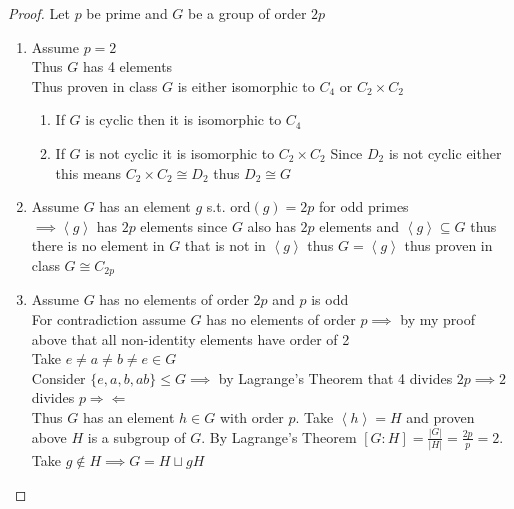 \documentclass[12pt, letterpaper]{article}
\theoremstyle{definition}
\newcommand{\contr}{\Rightarrow \Leftarrow}
\newcommand{\ang}[1]{\left\langle #1 \right\rangle}
\begin{document}
\begin{proof}
    Let $p$ be prime and $G$ be a group of order $2p$
    \begin{enumerate}
        \item Assume $p=2$\\
        Thus $G$ has 4 elements\\
        Thus proven in class $G$ is either isomorphic to $C_4$ or $C_2 \times C_2$
        \begin{enumerate}
            \item If $G$ is cyclic then it is isomorphic to $C_4$
            \item If $G$ is not cyclic it is isomorphic to $C_2 \times C_2$
            Since $D_2$ is not cyclic either this means $C_2 \times C_2 \cong D_2$ thus $D_2 \cong G$
        \end{enumerate}
        \item Assume $G$ has an element $g$ s.t. ord$(g)=2p$ for odd primes\\
        $\implies \ang{g}$ has $2p$ elements since $G$ also has $2p$ elements
        and $\ang{g} \subseteq G$ thus there is no element in $G$ that is not in $\ang{g}$ thus $G=\ang{g}$ thus proven in class $G \cong C_{2p}$
        \item Assume $G$ has no elements of order $2p$ and $p$ is odd\\
        For contradiction assume $G$ has no elements of order $p \implies$ by my proof above that all non-identity elements have order of 2\\
        Take $e \neq a \neq b \neq e \in G$\\
        Consider $\{e,a,b,ab\} \leq G \implies$ by Lagrange's Theorem that 4 divides $2p \implies 2$ divides $p \contr$\\
        Thus $G$ has an element $h \in G$ with order $p$. Take $\ang{h}=H$ and proven above $H$ is a subgroup of $G$.
        By Lagrange's Theorem $[G:H]=\frac{|G|}{|H|}=\frac{2p}{p}=2$. Take $g\notin H \implies G=H\sqcup gH$
        

\end{enumerate}
\end{proof}
\end{document}
